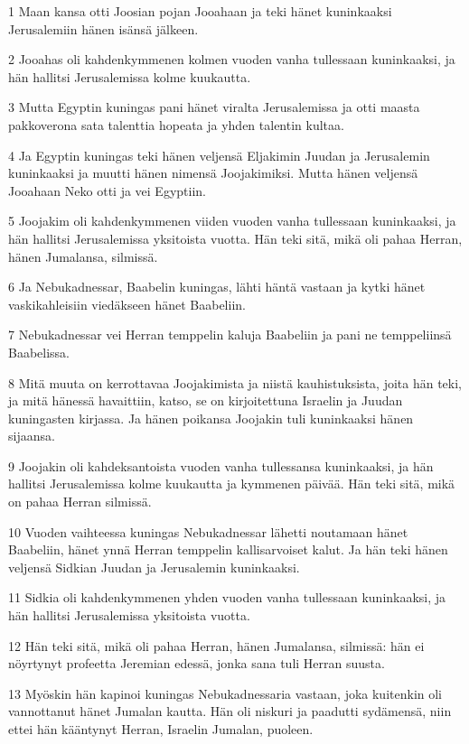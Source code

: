 \par 1 Maan kansa otti Joosian pojan Jooahaan ja teki hänet kuninkaaksi Jerusalemiin hänen isänsä jälkeen.
\par 2 Jooahas oli kahdenkymmenen kolmen vuoden vanha tullessaan kuninkaaksi, ja hän hallitsi Jerusalemissa kolme kuukautta.
\par 3 Mutta Egyptin kuningas pani hänet viralta Jerusalemissa ja otti maasta pakkoverona sata talenttia hopeata ja yhden talentin kultaa.
\par 4 Ja Egyptin kuningas teki hänen veljensä Eljakimin Juudan ja Jerusalemin kuninkaaksi ja muutti hänen nimensä Joojakimiksi. Mutta hänen veljensä Jooahaan Neko otti ja vei Egyptiin.
\par 5 Joojakim oli kahdenkymmenen viiden vuoden vanha tullessaan kuninkaaksi, ja hän hallitsi Jerusalemissa yksitoista vuotta. Hän teki sitä, mikä oli pahaa Herran, hänen Jumalansa, silmissä.
\par 6 Ja Nebukadnessar, Baabelin kuningas, lähti häntä vastaan ja kytki hänet vaskikahleisiin viedäkseen hänet Baabeliin.
\par 7 Nebukadnessar vei Herran temppelin kaluja Baabeliin ja pani ne temppeliinsä Baabelissa.
\par 8 Mitä muuta on kerrottavaa Joojakimista ja niistä kauhistuksista, joita hän teki, ja mitä hänessä havaittiin, katso, se on kirjoitettuna Israelin ja Juudan kuningasten kirjassa. Ja hänen poikansa Joojakin tuli kuninkaaksi hänen sijaansa.
\par 9 Joojakin oli kahdeksantoista vuoden vanha tullessansa kuninkaaksi, ja hän hallitsi Jerusalemissa kolme kuukautta ja kymmenen päivää. Hän teki sitä, mikä on pahaa Herran silmissä.
\par 10 Vuoden vaihteessa kuningas Nebukadnessar lähetti noutamaan hänet Baabeliin, hänet ynnä Herran temppelin kallisarvoiset kalut. Ja hän teki hänen veljensä Sidkian Juudan ja Jerusalemin kuninkaaksi.
\par 11 Sidkia oli kahdenkymmenen yhden vuoden vanha tullessaan kuninkaaksi, ja hän hallitsi Jerusalemissa yksitoista vuotta.
\par 12 Hän teki sitä, mikä oli pahaa Herran, hänen Jumalansa, silmissä: hän ei nöyrtynyt profeetta Jeremian edessä, jonka sana tuli Herran suusta.
\par 13 Myöskin hän kapinoi kuningas Nebukadnessaria vastaan, joka kuitenkin oli vannottanut hänet Jumalan kautta. Hän oli niskuri ja paadutti sydämensä, niin ettei hän kääntynyt Herran, Israelin Jumalan, puoleen.
